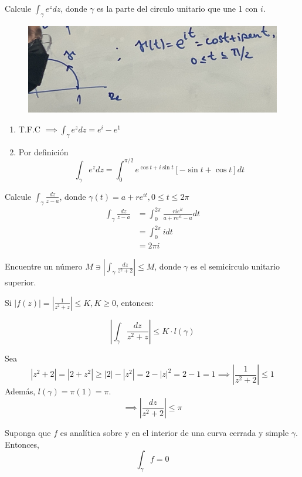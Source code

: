 \begin{ejemplo}
    Calcule $\int_\gamma e^z dz$, donde $\gamma$ es la parte del circulo unitario que une 1 con $i$. 
    \begin{figure}[H]
        \centering
        \includegraphics[scale=0.1]{imagenes/8-25-2.jpeg}
    \end{figure}
    \begin{enumerate}
        \item T.F.C $\implies \int_\gamma e^z dz=e^i-e^1$
        \item Por definición 
        $$ \int_\gamma e^z dz =\int_0^{\pi/2}e^{\cos t + i\sin t}[-\sin t + \cos t]dt$$
    \end{enumerate}
\end{ejemplo}

\begin{ejemplo}
    Calcule $\int_\gamma\frac{dz}{z-a}$, donde $\gamma(t)=a+re^{it},0\leq t\leq 2\pi$
    \begin{align*}
        \int_\gamma \frac{dz}{z-a} &= \int_0^{2\pi}\frac{rie^{it}}{a+re^{it}-a}dt\\
        &= \int_0^{2\pi}idt\\
        &= 2\pi i
    \end{align*}
\end{ejemplo}

\begin{ejemplo}
    Encuentre un número $M\ni \left|\int_\gamma \frac{dz}{z^2+2}\right|\leq M$, donde $\gamma$ es el semicirculo unitario superior. 
    \begin{sol}
        Si $|f(z)|=|\frac{1}{z^2+z}|\leq K,K\geq 0$, entonces: 

        $$\left|\int_\gamma \frac{dz}{z^2+z}\right|\leq K\cdot l(\gamma )$$

        Sea 
        $$|z^2+2|=|2+z^2|\geq |2|-|z^2|=2-|z|^2 = 2-1 =1\implies |\frac{1}{z^2+2}|\leq 1$$
        Además, $l(\gamma)=\pi(1)=\pi$. 
        $$\implies \left|\frac{dz}{z^2+2}\right|\leq \pi$$
    \end{sol}

\end{ejemplo}

\begin{teorema}
    Suponga que $f$ es analítica sobre y en el interior de una curva cerrada y simple $\gamma$. Entonces, 
    $$\int_\gamma f=0$$
\end{teorema}